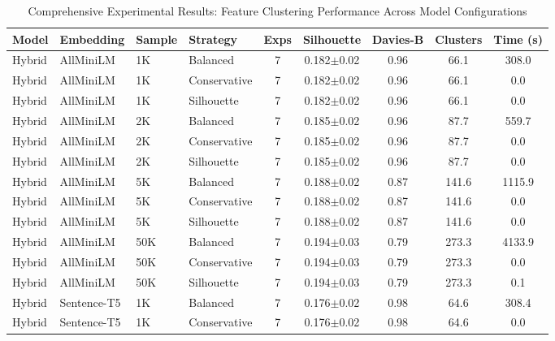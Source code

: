 

\begin{table*}[htbp]
\centering
\caption{Comprehensive Experimental Results: Feature Clustering Performance Across Model Configurations}
\label{tab:experimental_results}
\footnotesize
\begin{tabular}{|l|l|l|l|c|c|c|c|c|}
\hline
\textbf{Model} & \textbf{Embedding} & \textbf{Sample} & \textbf{Strategy} & \textbf{Exps} & \textbf{Silhouette} & \textbf{Davies-B} & \textbf{Clusters} & \textbf{Time (s)} \\
\hline
Hybrid & AllMiniLM & 1K & Balanced & 7 & 0.182$\pm$0.02 & 0.96 & 66.1 & 308.0 \\
Hybrid & AllMiniLM & 1K & Conservative & 7 & 0.182$\pm$0.02 & 0.96 & 66.1 & 0.0 \\
Hybrid & AllMiniLM & 1K & Silhouette & 7 & 0.182$\pm$0.02 & 0.96 & 66.1 & 0.0 \\
Hybrid & AllMiniLM & 2K & Balanced & 7 & 0.185$\pm$0.02 & 0.96 & 87.7 & 559.7 \\
Hybrid & AllMiniLM & 2K & Conservative & 7 & 0.185$\pm$0.02 & 0.96 & 87.7 & 0.0 \\
Hybrid & AllMiniLM & 2K & Silhouette & 7 & 0.185$\pm$0.02 & 0.96 & 87.7 & 0.0 \\
Hybrid & AllMiniLM & 5K & Balanced & 7 & 0.188$\pm$0.02 & 0.87 & 141.6 & 1115.9 \\
Hybrid & AllMiniLM & 5K & Conservative & 7 & 0.188$\pm$0.02 & 0.87 & 141.6 & 0.0 \\
Hybrid & AllMiniLM & 5K & Silhouette & 7 & 0.188$\pm$0.02 & 0.87 & 141.6 & 0.0 \\
Hybrid & AllMiniLM & 50K & Balanced & 7 & 0.194$\pm$0.03 & 0.79 & 273.3 & 4133.9 \\
Hybrid & AllMiniLM & 50K & Conservative & 7 & 0.194$\pm$0.03 & 0.79 & 273.3 & 0.0 \\
Hybrid & AllMiniLM & 50K & Silhouette & 7 & 0.194$\pm$0.03 & 0.79 & 273.3 & 0.1 \\
\hline
Hybrid & Sentence-T5 & 1K & Balanced & 7 & 0.176$\pm$0.02 & 0.98 & 64.6 & 308.4 \\
Hybrid & Sentence-T5 & 1K & Conservative & 7 & 0.176$\pm$0.02 & 0.98 & 64.6 & 0.0 \\

\end{tabular}
\end{table*}
